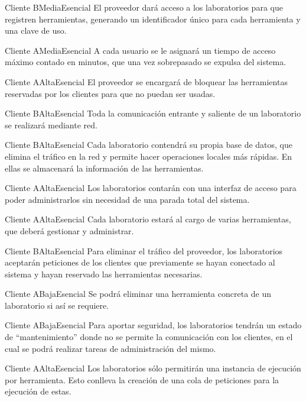 {Cliente B}{Media}{Esencial}
{
El proveedor dará acceso a los laboratorios para que registren 
herramientas, generando un identificador único para cada herramienta y 
una clave de uso.
}

{Cliente A}{Media}{Esencial}
{
A cada usuario se le asignará un tiempo de acceso máximo contado en 
minutos, que una vez sobrepasado se expulsa del sistema.
}

{Cliente A}{Alta}{Esencial}
{
El proveedor se encargará de bloquear las herramientas reservadas por 
los clientes para que no puedan ser usadas.
}

{Cliente B}{Alta}{Esencial}
{
Toda la comunicación entrante y saliente de un laboratorio se 
realizará mediante red.
}

{Cliente B}{Alta}{Esencial}
{
Cada laboratorio contendrá su propia base de datos, que elimina el tráfico 
en la red y permite hacer operaciones locales más rápidas. En ellas 
se almacenará la información de las herramientas.
}

{Cliente A}{Alta}{Esencial}
{
Los laboratorios contarán con una interfaz de acceso para poder 
administrarlos sin necesidad de una parada total del sistema.
}

{Cliente A}{Alta}{Esencial}
{
Cada laboratorio estará al cargo de varias herramientas, que deberá 
gestionar y administrar.
}

{Cliente B}{Alta}{Esencial}
{
Para eliminar el tráfico del proveedor, los laboratorios aceptarán
peticiones de los clientes que previamente se hayan conectado al 
sistema y hayan reservado las herramientas necesarias.
}

{Cliente A}{Baja}{Esencial}
{
Se podrá eliminar una herramienta concreta de un laboratorio si así se 
requiere.
}

{Cliente A}{Baja}{Esencial}
{
Para aportar seguridad, los laboratorios tendrán un estado de 
``mantenimiento'' donde no se permite la comunicación con los 
clientes, en el cual se podrá realizar tareas de administración del 
mismo.
}

{Cliente A}{Alta}{Esencial}
{
Los laboratorios sólo permitirán una instancia de ejecución por 
herramienta. Esto conlleva la creación de una cola de peticiones para 
la ejecución de estas.
}

